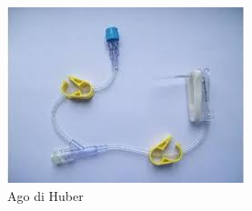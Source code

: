 \begin{figure}[H]
    \begin{center}
    \includegraphics[width=0.5\columnwidth]{img/agohuber.jpeg}
    \end{center}
    \caption[Ago di Huber]{Ago di Huber
    \cite{img45}}

\end{figure}

